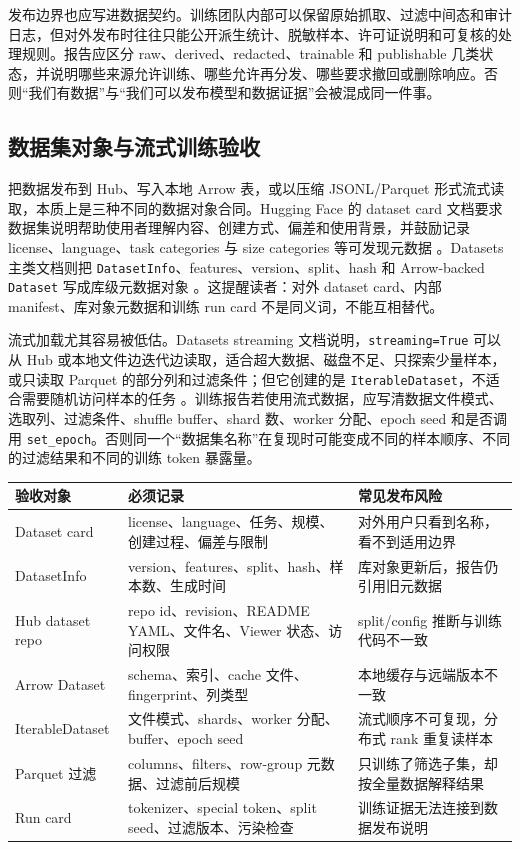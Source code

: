 \documentclass[UTF8,zihao=-4,openany]{ctexbook}
\begin{document}
发布边界也应写进数据契约。训练团队内部可以保留原始抓取、过滤中间态和审计日志，但对外发布时往往只能公开派生统计、脱敏样本、许可证说明和可复核的处理规则。报告应区分 raw、derived、redacted、trainable 和 publishable 几类状态，并说明哪些来源允许训练、哪些允许再分发、哪些要求撤回或删除响应。否则“我们有数据”与“我们可以发布模型和数据证据”会被混成同一件事。

\subsection{数据集对象与流式训练验收}
把数据发布到 Hub、写入本地 Arrow 表，或以压缩 JSONL/Parquet 形式流式读取，本质上是三种不同的数据对象合同。Hugging Face 的 dataset card 文档要求数据集说明帮助使用者理解内容、创建方式、偏差和使用背景，并鼓励记录 license、language、task categories 与 size categories 等可发现元数据 \cite{huggingface2026datasetcards}。Datasets 主类文档则把 \texttt{DatasetInfo}、features、version、split、hash 和 Arrow-backed \texttt{Dataset} 写成库级元数据对象 \cite{huggingface2026datasetsmainclasses}。这提醒读者：对外 dataset card、内部 manifest、库对象元数据和训练 run card 不是同义词，不能互相替代。

流式加载尤其容易被低估。Datasets streaming 文档说明，\texttt{streaming=True} 可以从 Hub 或本地文件边迭代边读取，适合超大数据、磁盘不足、只探索少量样本，或只读取 Parquet 的部分列和过滤条件；但它创建的是 \texttt{IterableDataset}，不适合需要随机访问样本的任务 \cite{huggingface2026datasetsstream}。训练报告若使用流式数据，应写清数据文件模式、选取列、过滤条件、shuffle buffer、shard 数、worker 分配、epoch seed 和是否调用 \texttt{set\_epoch}。否则同一个“数据集名称”在复现时可能变成不同的样本顺序、不同的过滤结果和不同的训练 token 暴露量。

\begin{center}
\small
\begin{tabular}{@{}>{\raggedright\arraybackslash}p{}>{\raggedright\arraybackslash}p{}>{\raggedright\arraybackslash}p{}@{}}
\toprule
验收对象 & 必须记录 & 常见发布风险 \\
\midrule
Dataset card & license、language、任务、规模、创建过程、偏差与限制 & 对外用户只看到名称，看不到适用边界 \\
DatasetInfo & version、features、split、hash、样本数、生成时间 & 库对象更新后，报告仍引用旧元数据 \\
Hub dataset repo & repo id、revision、README YAML、文件名、Viewer 状态、访问权限 & split/config 推断与训练代码不一致 \\
Arrow Dataset & schema、索引、cache 文件、fingerprint、列类型 & 本地缓存与远端版本不一致 \\
IterableDataset & 文件模式、shards、worker 分配、buffer、epoch seed & 流式顺序不可复现，分布式 rank 重复读样本 \\
Parquet 过滤 & columns、filters、row-group 元数据、过滤前后规模 & 只训练了筛选子集，却按全量数据解释结果 \\
Run card & tokenizer、special token、split seed、过滤版本、污染检查 & 训练证据无法连接到数据发布说明 \\
\bottomrule
\end{tabular}
\end{center}
\end{document}

